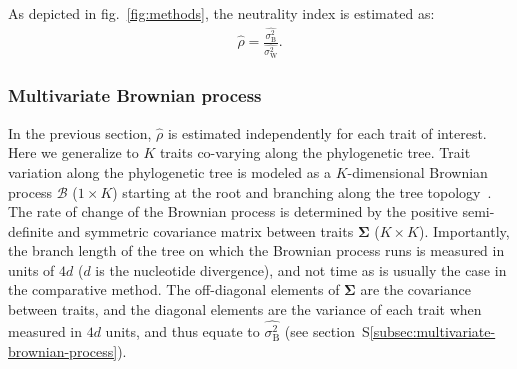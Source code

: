 \documentclass{article}
\newcommand{\UniDimArray}[1]{\bm{#1}}
\newcommand{\BiDimArray}[1]{\bm{#1}}
\newcommand{\RateBetween}{\sigma^2_{\mathrm{B}}}
\newcommand{\RateWhithin}{\sigma^2_{\mathrm{W}}}
\newcommand{\EstRateBetween}{\widehat{\RateBetween}}
\newcommand{\EstRateWhithin}{\widehat{\RateWhithin}}
\newcommand{\EstNI}{\widehat{\rho}}
\newcommand{\Ntrait}{K}
\newcommand{\Covariancematrix}{\Sigma}
\newcommand{\CovarianceMatrix}{\BiDimArray{\Covariancematrix}}
\newcommand{\brownian}{\mathcal{B}}
\newcommand{\Brownian}{\UniDimArray{\brownian}}
\begin{document}
As depicted in fig.~\ref{fig:methods}, the neutrality index is estimated as:
\begin{gather}
    \EstNI = \frac{\EstRateBetween}{\EstRateWhithin}. \label{eq:estimated-NI}
\end{gather}

\subsubsection*{Multivariate Brownian process}

In the previous section, $\EstNI$ is estimated independently for each trait of interest. 
Here we generalize to $\Ntrait$ traits co-varying along the phylogenetic tree.
Trait variation along the phylogenetic tree is modeled as a $\Ntrait$-dimensional Brownian process $\Brownian$ ($1 \times \Ntrait$) starting at the root and branching along the tree topology~\parencite{huelsenbeck_detecting_2003, lartillot_phylogenetic_2011, lartillot_joint_2012, latrille_inferring_2021}.
The rate of change of the Brownian process is determined by the positive semi-definite and symmetric covariance matrix between traits $\CovarianceMatrix$ ($\Ntrait \times \Ntrait$).
Importantly, the branch length of the tree on which the Brownian process runs is measured in units of $4d$ ($d$ is the nucleotide divergence), and not time as is usually the case in the comparative method. The off-diagonal elements of $\CovarianceMatrix$ are the covariance between traits, and the diagonal elements are the variance of each trait when measured in $4d$ units, and thus equate to $\EstRateBetween$ (see section~S\ref{subsec:multivariate-brownian-process}).
\end{document}
